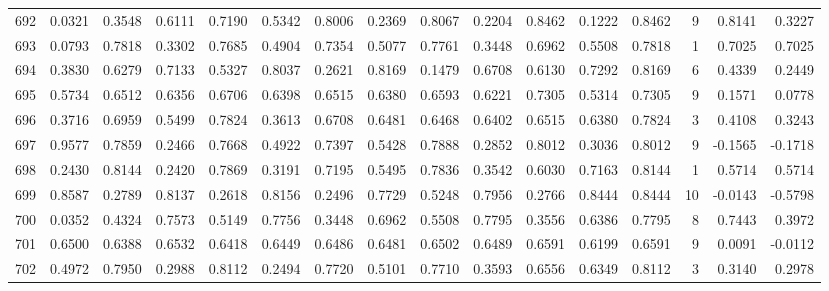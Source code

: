 \begin{tabular}{lrrrrrrrrrrrrrrr}
692 &      0.0321 &  0.3548 &  0.6111 &  0.7190 &  0.5342 &  0.8006 &  0.2369 &  0.8067 &  0.2204 &  0.8462 &   0.1222 &     0.8462 &      9 &                    0.8141 &                     0.3227 \\
693 &      0.0793 &  0.7818 &  0.3302 &  0.7685 &  0.4904 &  0.7354 &  0.5077 &  0.7761 &  0.3448 &  0.6962 &   0.5508 &     0.7818 &      1 &                    0.7025 &                     0.7025 \\
694 &      0.3830 &  0.6279 &  0.7133 &  0.5327 &  0.8037 &  0.2621 &  0.8169 &  0.1479 &  0.6708 &  0.6130 &   0.7292 &     0.8169 &      6 &                    0.4339 &                     0.2449 \\
695 &      0.5734 &  0.6512 &  0.6356 &  0.6706 &  0.6398 &  0.6515 &  0.6380 &  0.6593 &  0.6221 &  0.7305 &   0.5314 &     0.7305 &      9 &                    0.1571 &                     0.0778 \\
696 &      0.3716 &  0.6959 &  0.5499 &  0.7824 &  0.3613 &  0.6708 &  0.6481 &  0.6468 &  0.6402 &  0.6515 &   0.6380 &     0.7824 &      3 &                    0.4108 &                     0.3243 \\
697 &      0.9577 &  0.7859 &  0.2466 &  0.7668 &  0.4922 &  0.7397 &  0.5428 &  0.7888 &  0.2852 &  0.8012 &   0.3036 &     0.8012 &      9 &                   -0.1565 &                    -0.1718 \\
698 &      0.2430 &  0.8144 &  0.2420 &  0.7869 &  0.3191 &  0.7195 &  0.5495 &  0.7836 &  0.3542 &  0.6030 &   0.7163 &     0.8144 &      1 &                    0.5714 &                     0.5714 \\
699 &      0.8587 &  0.2789 &  0.8137 &  0.2618 &  0.8156 &  0.2496 &  0.7729 &  0.5248 &  0.7956 &  0.2766 &   0.8444 &     0.8444 &     10 &                   -0.0143 &                    -0.5798 \\
700 &      0.0352 &  0.4324 &  0.7573 &  0.5149 &  0.7756 &  0.3448 &  0.6962 &  0.5508 &  0.7795 &  0.3556 &   0.6386 &     0.7795 &      8 &                    0.7443 &                     0.3972 \\
701 &      0.6500 &  0.6388 &  0.6532 &  0.6418 &  0.6449 &  0.6486 &  0.6481 &  0.6502 &  0.6489 &  0.6591 &   0.6199 &     0.6591 &      9 &                    0.0091 &                    -0.0112 \\
702 &      0.4972 &  0.7950 &  0.2988 &  0.8112 &  0.2494 &  0.7720 &  0.5101 &  0.7710 &  0.3593 &  0.6556 &   0.6349 &     0.8112 &      3 &                    0.3140 &                     0.2978 \\

\end{tabular}

